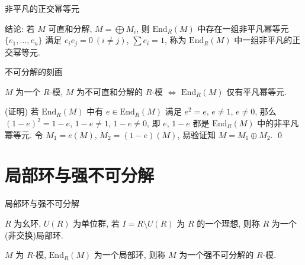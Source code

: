 
\begin{frame}{非平凡的正交幂等元}

结论: 若 $M$ 可直和分解, $M = \bigoplus M_i$, 则 $\mathrm{End}_R(M)$ 中存在一组非平凡幂等元
$\{ e_1, \dots, e_n \}$ 满足 $e_i e_j = 0\ (i \neq j)$, $\sum e_i = 1$,
称为 $\mathrm{End}_R(M)$ 中一组非平凡的正交幂等元.

\end{frame}


\begin{frame}{不可分解的刻画}

\begin{lem}[不可分解的刻画]
$M$ 为一个 $R$-模, $M$ 为不可直和分解的 $R$-模 $\iff$
$\mathrm{End}_R(M)$ 仅有平凡幂等元.
\end{lem}


\startproof[bg=yellow, fg=red](证明)
若 $\mathrm{End}_R(M)$ 中有 $e \in \mathrm{End}_R(M)$ 满足 $e^2 = e$, $e \neq 1$, $e \neq 0$,
那么 $(1 - e)^2 = 1 - e$, $1 - e \neq 1$, $1 - e \neq 0$,
即 $e$, $1 - e$ 都是 $\mathrm{End}_R(M)$ 中的非平凡幂等元.
令 $M_1 = e(M)$, $M_2 = (1 - e)(M)$,
易验证知 $M = M_1 \oplus M_2$.
\qed

\end{frame}


\section[局部环]{局部环与强不可分解}


\begin{frame}{局部环与强不可分解}

\begin{Def}
$R$ 为幺环, $U(R)$ 为单位群, 若 $I = R \setminus U(R)$ 为 $R$ 的一个理想,
则称 $R$ 为一个(非交换)局部环.
\end{Def}

\pause

\begin{Def}[强不可分解模]
$M$ 为 $R$-模, $\mathrm{End}_R(M)$ 为一个局部环,
则称 $M$ 为一个强不可分解的 $R$-模.
\end{Def}

\end{frame}


